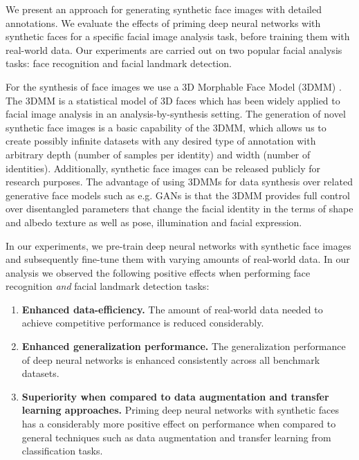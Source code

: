 \documentclass[10pt,twocolumn,letterpaper]{article}
\begin{document}
	We present an approach for generating synthetic face images with detailed annotations. We evaluate the effects of priming deep neural networks with synthetic faces for a specific facial image analysis task, before training them with real-world data. Our experiments are carried out on two popular facial analysis tasks: face recognition and facial landmark detection.
	
	For the synthesis of face images we use a 3D Morphable Face Model (3DMM) \cite{blanz1999morphable,gerig2018morphable}. The 3DMM is a statistical model of 3D faces which has been widely applied to facial image analysis in an analysis-by-synthesis setting.  The generation of novel synthetic face images is a basic capability of the 3DMM, which allows us to create possibly infinite datasets with any desired type of annotation with arbitrary depth (number of samples per identity) and width (number of identities). Additionally, synthetic face images can be released publicly for research purposes. The advantage of using 3DMMs for data synthesis over related generative face models such as e.g. GANs \cite{berthelot2017began,goodfellow2014generative} is that the 3DMM provides full control over disentangled parameters that change the facial identity in the terms of shape and albedo texture as well as pose, illumination and facial expression. 

	In our experiments, we pre-train deep neural networks with synthetic face images and subsequently fine-tune them with varying amounts of real-world data. In our analysis we observed the following positive effects when performing face recognition \textit{and} facial landmark detection tasks:
    \begin{enumerate}
		\item \textbf{Enhanced data-efficiency.} The amount of real-world data needed to achieve competitive performance is reduced considerably.
		\item \textbf{Enhanced generalization performance.} The generalization performance of deep neural networks is enhanced consistently across all benchmark datasets.
        \item \textbf{Superiority when compared to data augmentation and transfer learning approaches.} Priming deep neural networks with synthetic faces has a considerably more positive effect on performance when compared to general techniques such as data augmentation and transfer learning from classification tasks. 
    \end{enumerate}
    
\end{document}
